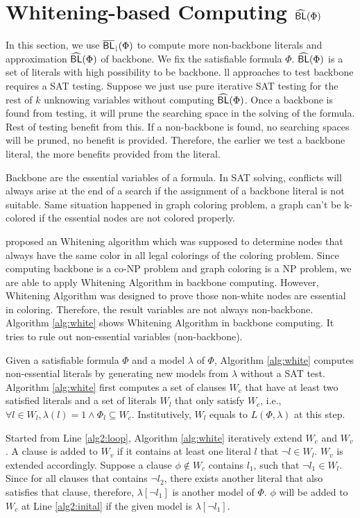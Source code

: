 \section{Whitening-based Computing ${\sf \widehat{BL}}(\Phi)$}
In this section, we use ${\sf \overline{BL}_\downharpoonright}(\Phi)$ to compute more non-backbone literals and approximation ${\sf \widehat{BL}}(\Phi)$ of backbone. We fix the satisfiable formula $\Phi$. ${\sf \widehat{BL}}(\Phi)$ is a set of literals with high possibility to be backbone. ll approaches to test backbone requires a SAT testing. Suppose we just use pure iterative SAT testing \cite{JLM15} for the rest of $k$ unknowing variables without computing ${\sf \widehat{BL}}(\Phi)$. Once a backbone is found from testing, it will prune the searching space in the solving of the formula. Rest of testing benefit from this. If a non-backbone is found, no searching spaces will be pruned, no benefit is provided. Therefore, the earlier we test a backbone literal, the more benefits provided from the literal.

Backbone are the essential variables of a formula. In SAT solving, conflicts will always arise at the end of a search if the assignment of a backbone literal is not suitable. Same situation happened in graph coloring problem, a graph can't be k-colored if the essential nodes are not colored properly.

\cite{Par03} proposed an Whitening algorithm which was supposed to determine nodes that always have the same color in all legal colorings of the coloring problem. Since computing backbone is a co-NP problem and graph coloring is a NP problem, we are able to apply Whitening Algorithm in backbone computing.
However, Whitening Algorithm was designed to prove those non-white nodes are essential in coloring. Therefore, the result variables are not always non-backbone.
Algorithm \ref{alg:white} shows Whitening Algorithm in backbone computing. It tries to rule out non-essential variables (non-backbone).

Given a satisfiable formula $\Phi$ and a model $\lambda$ of $\Phi$,
Algorithm \ref{alg:white} computes non-essential literals by generating new models from $\lambda$ without a SAT test.
Algorithm \ref{alg:white} first computes a set of clauses $W_c$ that have at least two satisfied literals and a set of literals $W_l$ that only satisfy $W_c$, i.e., $\forall l\in W_l, \lambda(l)=1\wedge \Phi_l\subseteq W_c$. Institutively, $W_l$ equals to $L(\Phi,\lambda)$ at this step.

Started from Line \ref{alg2:loop}, Algorithm \ref{alg:white} iteratively extend $W_c$ and $W_v$. A clause is added to $W_v$ if it contains at least one literal $l$ that $\neg l\in W_l$. $W_v$ is extended accordingly. Suppose a clause $\phi\notin W_c$ contains $l_1$, such that $\neg l_1\in W_l$. Since for all clauses that contains $\neg l_2$, there exists another literal that also satisfies that clause, therefore, $\lambda[\neg l_1]$ is another model of $\Phi$. $\phi$ will be added to $W_c$ at Line \ref{alg2:inital} if the given model is $\lambda[\neg l_1]$.

